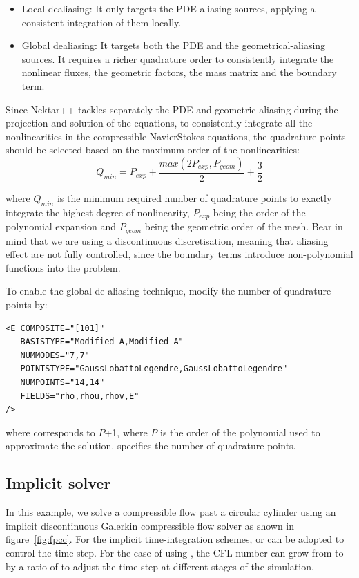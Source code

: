 \begin{itemize}
\item Local dealiasing: It only targets the PDE-aliasing sources, applying a consistent integration of them locally.
\item Global dealiasing: It targets both the PDE and the geometrical-aliasing sources. 
It requires a richer quadrature order to consistently integrate the nonlinear fluxes, 
the geometric factors, the mass matrix and the boundary term.
\end{itemize}

Since Nektar++ tackles separately the PDE and geometric aliasing during the
projection and solution of the equations, to consistently
integrate all the nonlinearities in the compressible
NavierStokes equations, the quadrature points should
be selected based on the maximum order of the nonlinearities:
\begin{equation}
Q_{min}= P_{exp}+\frac{max(2P_{exp},P_{geom})}{2} + \frac{3}{2}
\end{equation}

where $Q_{min}$ is the minimum required number of quadrature
points to exactly integrate the highest-degree of nonlinearity,
$P_{exp}$ being the order of the polynomial expansion and $P_{geom}$
being the geometric order of the mesh. Bear in mind that we are
using a discontinuous discretisation, meaning that aliasing
effect are not fully controlled, since the boundary terms
introduce non-polynomial functions into the problem.

To enable the global de-aliasing technique, modify the number of quadrature
points by:

\begin{lstlisting}[style=XmlStyle]
<E COMPOSITE="[101]"
   BASISTYPE="Modified_A,Modified_A"
   NUMMODES="7,7"
   POINTSTYPE="GaussLobattoLegendre,GaussLobattoLegendre"
   NUMPOINTS="14,14"
   FIELDS="rho,rhou,rhov,E"
/>
\end{lstlisting}

where  corresponds to $P$+1, where $P$ is the order of the polynomial
used to approximate the solution.  specifies the number of quadrature
points.


\subsection{Implicit solver}
In this example, we solve a compressible flow past a circular cylinder using an 
implicit discontinuous Galerkin compressible flow solver as shown in figure~\ref{fig:fpcc}. 
For the implicit time-integration schemes,  or  
can be adopted to control the time step. For the case of using , the CFL number 
can grow from  to  by a ratio of  to adjust 
the time step at different stages of the simulation. 

